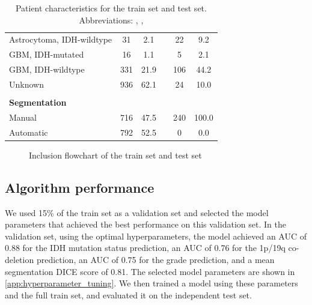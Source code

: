 \begin{table}[htbp]
\begin{tabular}{l S[table-format=4.0] S[table-format=3.1] C{0.5cm} S[table-format=4.0] S[table-format=3.1]}
\hspace{1em}Astrocytoma, \acrshort{IDH}-wildtype & 31 & 2.1 && 22 & 9.2\\
\hspace{1em}\acrshort{GBM}, \acrshort{IDH}-mutated & 16 & 1.1 && 5 & 2.1\\
\hspace{1em}\acrshort{GBM}, \acrshort{IDH}-wildtype & 331 & 21.9 && 106 &44.2\\
\hspace{1em}Unknown & 936 & 62.1 && 24 & 10.0\\
\\
\textbf{Segmentation}\\
\hspace{1em}Manual & 716 & 47.5 && 240 & 100.0\\
\hspace{1em}Automatic & 792 & 52.5 && 0 & 0.0\\

\bottomrule
\end{tabular}
\caption{Patient characteristics for the train set and test set.
Abbreviations: , , }\label{tab:patient_char}
\end{table}

\begin{figure}
\centering
\resizebox{\textwidth}{!}{}
\caption{Inclusion flowchart of the train set and test set}\label{fig:inclusion_flowchart}
\end{figure}

\subsection{Algorithm performance}

We used 15\% of the train set as a validation set and selected the model parameters that achieved the best performance on this validation set.
In the validation set, using the optimal hyperparameters, the model achieved an \gls{AUC} of 0.88 for the \gls{IDH} mutation status prediction, an \gls{AUC} of 0.76 for the 1p/19q co-deletion prediction, an \gls{AUC} of 0.75 for the grade prediction, and a mean segmentation DICE score of 0.81.
The selected model parameters are shown in \cref{app:hyperparameter_tuning}.
We then trained a model using these parameters and the full train set, and evaluated it on the independent test set.

